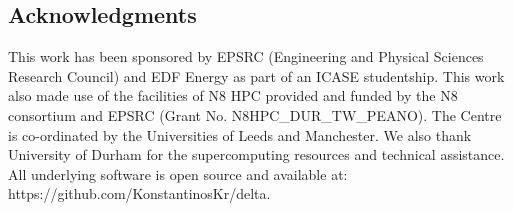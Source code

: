 \documentclass[times,12pt]{article}
\begin{document}
\subsection{Acknowledgments}
This work has been sponsored by EPSRC (Engineering and Physical Sciences Research Council) and EDF Energy as part of an ICASE studentship. This work also made use of the facilities of N8 HPC provided and funded by the N8 consortium and EPSRC (Grant No. N8HPC{\_}DUR{\_}TW{\_}PEANO). The Centre is co-ordinated by the Universities of Leeds and Manchester. We also thank University of Durham for the supercomputing resources and technical assistance. All underlying software is open source and available at: https://github.com/KonstantinosKr/delta.



\end{document}
